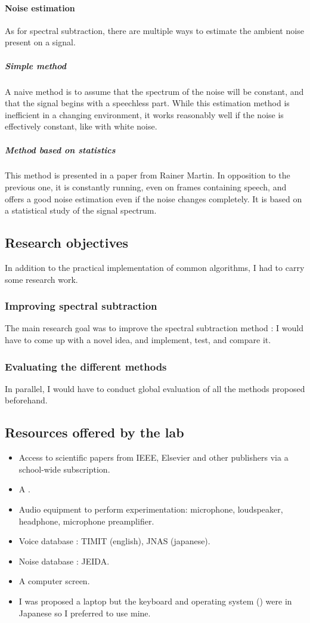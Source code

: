 \paragraph{Noise estimation}
As for spectral subtraction, there are multiple ways to estimate the ambient noise present on a signal.
\subparagraph{Simple method}
A naive method is to assume that the spectrum of the noise will be constant, and that the signal begins with a speechless part. While this estimation method is inefficient in a changing environment, it works reasonably well if the noise is effectively constant, like with white noise.
\subparagraph{Method based on statistics}
This method is presented in a paper from Rainer Martin\cite{martin2001noise}. In opposition to the previous one, it is constantly running, even on frames containing speech, and offers a good noise estimation even if the noise changes completely. It is based on a statistical study of the signal spectrum.
\subsection{Research objectives}
In addition to the practical implementation of common algorithms, I had to carry some research work.
\subsubsection{Improving spectral subtraction}
The main research goal was to improve the spectral subtraction method : I would have to come up with a novel idea, and implement, test, and compare it.
\subsubsection{Evaluating the different methods}
In parallel, I would have to conduct global evaluation of all the methods proposed beforehand.
\subsection{Resources offered by the lab}
\begin{itemize}
\item Access to scientific papers from \ac{IEEE}, Elsevier and other publishers via a school-wide subscription.
\item A .
\item Audio equipment to perform experimentation: microphone, loudspeaker, headphone, microphone preamplifier. 
\item Voice database : \ac{TIMIT} (english), \ac{JNAS} (japanese).
\item Noise database : \ac{JEIDA}.
\item A computer screen.
\item I was proposed a laptop but the keyboard and operating system () were in Japanese so I preferred to use mine.

\end{itemize}
